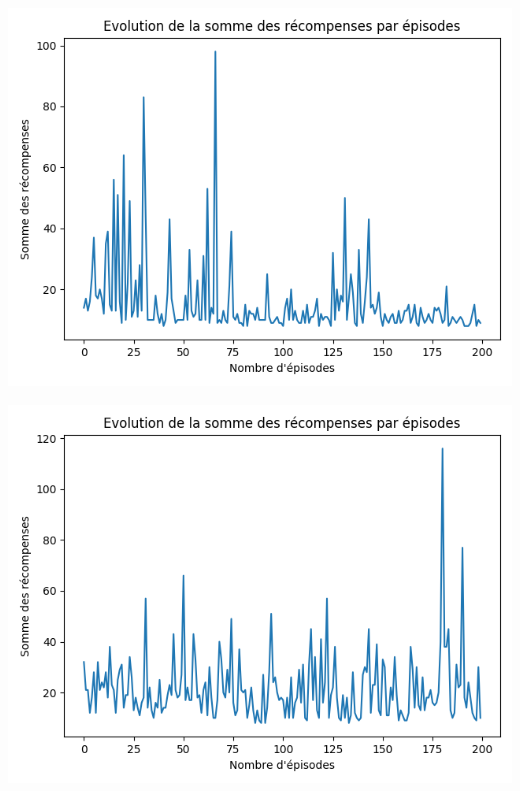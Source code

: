\documentclass[10pt,a4paper]{article}
\begin{document}
\begin{minipage}{.5\textwidth}
  \centering
  \includegraphics[scale=0.3]{../performances/tarnetRelu30.png}
\end{minipage}%
\begin{minipage}{.5\textwidth}
  \centering
  \includegraphics[scale=0.3]{../performances/tarnetRelu1024.png}
\end{minipage}
\end{document}
